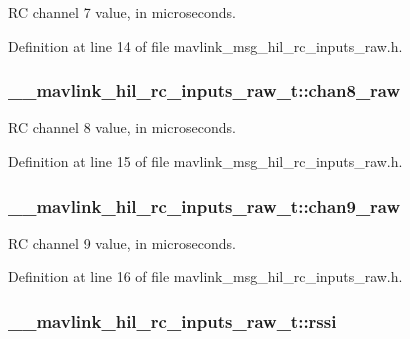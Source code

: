 R\-C channel 7 value, in microseconds. 



Definition at line 14 of file mavlink\-\_\-msg\-\_\-hil\-\_\-rc\-\_\-inputs\-\_\-raw.\-h.

\hypertarget{struct____mavlink__hil__rc__inputs__raw__t_a5e2a946b0960b971317637874d4f2678}{
\subsubsection[{chan8\-\_\-raw}]{ \-\_\-\-\_\-mavlink\-\_\-hil\-\_\-rc\-\_\-inputs\-\_\-raw\-\_\-t\-::chan8\-\_\-raw}}\label{struct____mavlink__hil__rc__inputs__raw__t_a5e2a946b0960b971317637874d4f2678}


R\-C channel 8 value, in microseconds. 



Definition at line 15 of file mavlink\-\_\-msg\-\_\-hil\-\_\-rc\-\_\-inputs\-\_\-raw.\-h.

\hypertarget{struct____mavlink__hil__rc__inputs__raw__t_aebe7c293f27d5b25c78caa8f762c57e2}{
\subsubsection[{chan9\-\_\-raw}]{ \-\_\-\-\_\-mavlink\-\_\-hil\-\_\-rc\-\_\-inputs\-\_\-raw\-\_\-t\-::chan9\-\_\-raw}}\label{struct____mavlink__hil__rc__inputs__raw__t_aebe7c293f27d5b25c78caa8f762c57e2}


R\-C channel 9 value, in microseconds. 



Definition at line 16 of file mavlink\-\_\-msg\-\_\-hil\-\_\-rc\-\_\-inputs\-\_\-raw.\-h.

\hypertarget{struct____mavlink__hil__rc__inputs__raw__t_aa126d8b574a26544c57605c5aa1f8684}{
\subsubsection[{rssi}]{ \-\_\-\-\_\-mavlink\-\_\-hil\-\_\-rc\-\_\-inputs\-\_\-raw\-\_\-t\-::rssi}}\label{struct____mavlink__hil__rc__inputs__raw__t_aa126d8b574a26544c57605c5aa1f8684}


